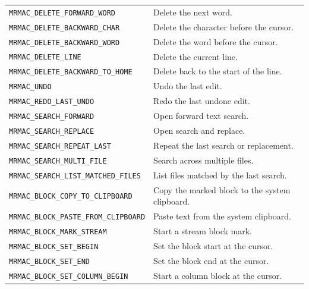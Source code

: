 \documentclass[a4paper,10pt,twoside,openany]{book}
\newenvironment{mrmacextension}{\begin{changebar}}{\end{changebar}}
\begin{document}
\begin{mrmacextension}
\begin{longtable}{@{}L{0.50\textwidth}@{\hspace{0.8em}}L{0.40\textwidth}@{}}
\texttt{MRMAC\_DELETE\_FORWARD\_WORD} & Delete the next word. \\
\texttt{MRMAC\_DELETE\_BACKWARD\_CHAR} & Delete the character before the cursor. \\
\texttt{MRMAC\_DELETE\_BACKWARD\_WORD} & Delete the word before the cursor. \\
\texttt{MRMAC\_DELETE\_LINE} & Delete the current line. \\
\texttt{MRMAC\_DELETE\_BACKWARD\_TO\_HOME} & Delete back to the start of the line. \\
\texttt{MRMAC\_UNDO} & Undo the last edit. \\
\texttt{MRMAC\_REDO\_LAST\_UNDO} & Redo the last undone edit. \\
\texttt{MRMAC\_SEARCH\_FORWARD} & Open forward text search. \\
\texttt{MRMAC\_SEARCH\_REPLACE} & Open search and replace. \\
\texttt{MRMAC\_SEARCH\_REPEAT\_LAST} & Repeat the last search or replacement. \\
\texttt{MRMAC\_SEARCH\_MULTI\_FILE} & Search across multiple files. \\
\texttt{MRMAC\_SEARCH\_LIST\_MATCHED\_FILES} & List files matched by the last search. \\
\texttt{MRMAC\_BLOCK\_COPY\_TO\_CLIPBOARD} & Copy the marked block to the system clipboard. \\
\texttt{MRMAC\_BLOCK\_PASTE\_FROM\_CLIPBOARD} & Paste text from the system clipboard. \\
\texttt{MRMAC\_BLOCK\_MARK\_STREAM} & Start a stream block mark. \\
\texttt{MRMAC\_BLOCK\_SET\_BEGIN} & Set the block start at the cursor. \\
\texttt{MRMAC\_BLOCK\_SET\_END} & Set the block end at the cursor. \\
\texttt{MRMAC\_BLOCK\_SET\_COLUMN\_BEGIN} & Start a column block at the cursor. \\

\end{longtable}
\end{mrmacextension}
\end{document}
